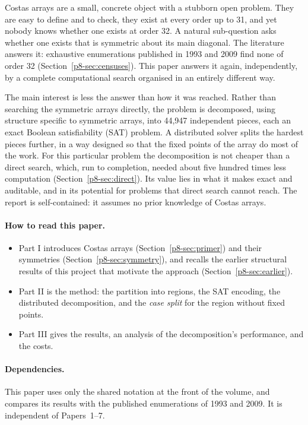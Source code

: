 \documentclass[11pt,a4paper,oneside]{report}
\theoremstyle{definition}
\begin{document}
Costas arrays are a small, concrete object with a stubborn open problem. They are easy to
define and to check, they exist at every order up to 31, and yet nobody knows whether one
exists at order 32. A natural sub-question asks whether one exists that is symmetric about its
main diagonal. The literature answers it: exhaustive enumerations published in 1993 and 2009 find
none of order 32 (Section~\ref{p8-sec:censuses}). This paper answers it again,
independently, by a complete computational search organised in an entirely different way.

The main interest is less the answer than how it was reached. Rather than searching the symmetric
arrays directly, the problem is decomposed, using structure specific to symmetric arrays, into 44{,}947
independent pieces, each an exact Boolean satisfiability (SAT) problem. A distributed
solver splits the hardest pieces further, in a way designed so that the fixed points of the
array do most of the work. For this particular problem the decomposition is not cheaper than a
direct search, which, run to completion, needed about five hundred times less computation (Section~\ref{p8-sec:direct}).
Its value lies in what it makes exact and auditable, and in its potential for problems that direct
search cannot reach. The report is self-contained: it assumes no prior knowledge of Costas arrays.

\paragraph{How to read this paper.}
\begin{itemize}
\item Part I introduces Costas arrays (Section~\ref{p8-sec:primer}) and their
symmetries (Section~\ref{p8-sec:symmetry}), and recalls the earlier structural results of this
project that motivate the approach (Section~\ref{p8-sec:earlier}).
\item Part II is the method: the partition into regions, the SAT encoding, the
distributed decomposition, and the \emph{case split} for the region without fixed points.
\item Part III gives the results, an analysis of the decomposition's performance,
and the costs.
\end{itemize}

\paragraph{Dependencies.} This paper uses only the shared notation at the front of the volume, and
compares its results with the published enumerations of 1993 and 2009. It is independent of
Papers~1--7.
\end{document}
